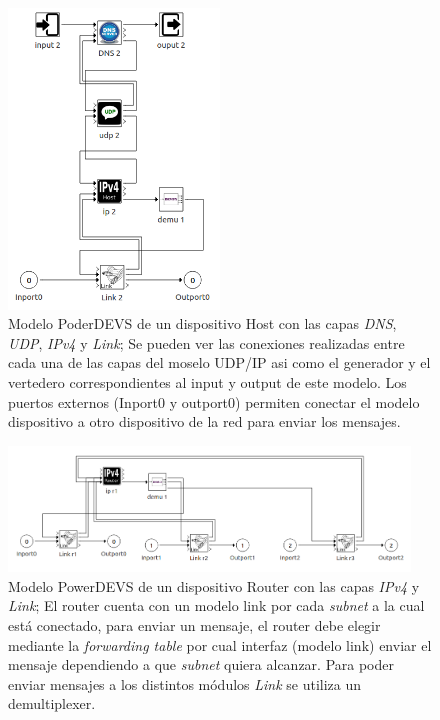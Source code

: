 \documentclass[10pt,a4paper]{article}
\begin{document}
\begin{figure}[!htb]
    \centering
    \includegraphics[width = 0.5\textwidth]{img/png/powerdevs/host.png}
    \caption{Modelo PoderDEVS de un dispositivo Host con las capas \textit{DNS}, \textit{UDP}, \textit{IPv4} y \textit{Link}; Se pueden ver las conexiones realizadas entre cada una de las capas del moselo UDP/IP asi como el generador y el vertedero correspondientes al input y output de este modelo. Los puertos externos (Inport0 y outport0) permiten conectar el modelo dispositivo a otro dispositivo de la red para enviar los mensajes.}
    \label{figure: powerdevs host}
\end{figure}

\begin{figure}[!htb]
    \centering
    \includegraphics[width = 0.95\textwidth]{img/png/powerdevs/router.png}
    \caption{Modelo PowerDEVS de un dispositivo Router con las capas \textit{IPv4} y \textit{Link}; El router cuenta con un modelo link por cada \textit{subnet} a la cual está conectado, para enviar un mensaje, el router debe elegir mediante la \textit{forwarding table} por cual interfaz (modelo link) enviar el mensaje dependiendo a que \textit{subnet} quiera alcanzar. Para poder enviar mensajes a los distintos módulos \textit{Link} se utiliza un demultiplexer.}
    \label{figure: powerdevs router}
\end{figure}
\end{document}
